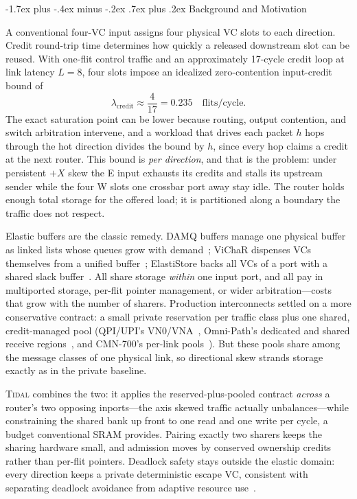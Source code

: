 \documentclass[10pt,twocolumn]{article}
\makeatletter
\newcommand{\system}{\textsc{Tidal}\xspace}
\renewcommand\section{\@startsection{section}{1}{\z@}%
  {-1.7ex plus -.4ex minus -.2ex}%
  {.7ex plus .2ex}%
  {\normalfont\large\bfseries}}
\makeatother
\begin{document}
\section{Background and Motivation}
\label{sec:background}

A conventional four-VC input assigns four physical VC slots to each
direction. Credit round-trip time determines how quickly a released downstream
slot can be reused. With one-flit control traffic and an approximately
17-cycle credit loop at link latency $L=8$, four slots impose an idealized
zero-contention input-credit bound of
\begin{equation}
  \lambda_{\mathrm{credit}} \approx \frac{4}{17}=0.235
  \quad\text{flits/cycle}.
\end{equation}
The exact saturation point can be lower because routing, output contention,
and switch arbitration intervene, and a workload that drives each packet $h$
hops through the hot direction divides the bound by $h$, since every hop
claims a credit at the next router. This bound is \emph{per direction}, and
that is the problem: under persistent $+X$ skew the E input exhausts its
credits and stalls its upstream sender while the four W slots one crossbar
port away stay idle. The router holds enough total storage for the offered
load; it is partitioned along a boundary the traffic does not respect.

Elastic buffers are the classic remedy. DAMQ buffers manage one physical
buffer as linked lists whose queues grow with demand~\cite{tamir1992damq};
ViChaR dispenses VCs themselves from a unified
buffer~\cite{nicopoulos2006vichar}; ElastiStore backs all VCs of a port with
a shared slack buffer~\cite{seitanidis2014elastistore}. All share storage
\emph{within} one input port, and all pay in multiported storage, per-flit
pointer management, or wider arbitration---costs that grow with the number of
sharers. Production interconnects settled on a more conservative contract:
a small private reservation per traffic class plus one shared, credit-managed
pool (QPI/UPI's VN0/VNA~\cite{intel2009qpi}, Omni-Path's dedicated and
shared receive regions~\cite{birrittella2015omnipath}, and CMN-700's
per-link pools~\cite{arm2021cmn700}). But these pools share among the
message classes of one physical link, so directional skew strands storage
exactly as in the private baseline.

\system combines the two: it applies the reserved-plus-pooled contract
\emph{across} a router's two opposing inports---the axis skewed traffic
actually unbalances---while constraining the shared bank up front to one read
and one write per cycle, a budget conventional SRAM provides. Pairing
exactly two sharers keeps the sharing hardware small, and admission moves by
conserved ownership credits rather than per-flit pointers. Deadlock safety
stays outside the elastic domain: every direction keeps a private
deterministic escape VC, consistent with separating deadlock avoidance from
adaptive resource use~\cite{dally1987deadlock,duato1993theory}.
\end{document}
